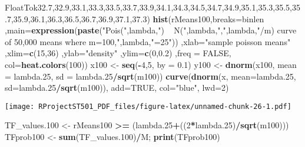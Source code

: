 \documentclass[
]{article}
\newenvironment{Shaded}{\begin{snugshade}}{\end{snugshade}}
\newcommand{\DataTypeTok}[1]{\textcolor[rgb]{0.13,0.29,0.53}{#1}}
\newcommand{\DecValTok}[1]{\textcolor[rgb]{0.00,0.00,0.81}{#1}}
\newcommand{\FloatTok}[1]{\textcolor[rgb]{0.00,0.00,0.81}{#1}}
\newcommand{\KeywordTok}[1]{\textcolor[rgb]{0.13,0.29,0.53}{\textbf{#1}}}
\newcommand{\NormalTok}[1]{#1}
\newcommand{\OperatorTok}[1]{\textcolor[rgb]{0.81,0.36,0.00}{\textbf{#1}}}
\newcommand{\OtherTok}[1]{\textcolor[rgb]{0.56,0.35,0.01}{#1}}
\newcommand{\StringTok}[1]{\textcolor[rgb]{0.31,0.60,0.02}{#1}}
\begin{document}
\begin{Shaded}
\begin{Highlighting}[]
FloatTok{32.7}\NormalTok{,}\FloatTok{32.9}\NormalTok{,}\FloatTok{33.1}\NormalTok{,}\FloatTok{33.3}\NormalTok{,}\FloatTok{33.5}\NormalTok{,}\FloatTok{33.7}\NormalTok{,}\FloatTok{33.9}\NormalTok{,}\FloatTok{34.1}\NormalTok{,}\FloatTok{34.3}\NormalTok{,}\FloatTok{34.5}\NormalTok{,}\FloatTok{34.7}\NormalTok{,}\FloatTok{34.9}\NormalTok{,}\FloatTok{35.1}\NormalTok{,}\FloatTok{35.3}\NormalTok{,}\FloatTok{35.5}\NormalTok{,}\FloatTok{35.7}\NormalTok{,}\FloatTok{35.9}\NormalTok{,}\FloatTok{36.1}\NormalTok{,}\FloatTok{36.3}\NormalTok{,}\FloatTok{36.5}\NormalTok{,}\FloatTok{36.7}\NormalTok{,}\FloatTok{36.9}\NormalTok{,}\FloatTok{37.1}\NormalTok{,}\FloatTok{37.3}\NormalTok{)}
\KeywordTok{hist}\NormalTok{(rMeans100,}\DataTypeTok{breaks=}\NormalTok{binlen ,}\DataTypeTok{main=}\KeywordTok{expression}\NormalTok{(}\KeywordTok{paste}\NormalTok{(}\StringTok{"Pois("}\NormalTok{,lambda,}\StringTok{") ~ N("}\NormalTok{,lambda,}\StringTok{","}\NormalTok{,lambda,}\StringTok{"/m) curve of 50,000 means where m=100,"}\NormalTok{,lambda,}\StringTok{"=25"}\NormalTok{))  ,}\DataTypeTok{xlab=}\StringTok{"sample poisson means"}\NormalTok{ ,}\DataTypeTok{xlim=}\KeywordTok{c}\NormalTok{(}\DecValTok{15}\NormalTok{,}\DecValTok{36}\NormalTok{) ,}\DataTypeTok{ylab=}\StringTok{"density"}\NormalTok{ ,}\DataTypeTok{ylim=}\KeywordTok{c}\NormalTok{(}\DecValTok{0}\NormalTok{,}\FloatTok{0.2}\NormalTok{) ,}\DataTypeTok{freq =} \OtherTok{FALSE}\NormalTok{, }\DataTypeTok{col=}\KeywordTok{heat.colors}\NormalTok{(}\DecValTok{100}\NormalTok{))}
\NormalTok{x100 <-}\StringTok{ }\KeywordTok{seq}\NormalTok{(}\OperatorTok{-}\DecValTok{4}\NormalTok{,}\DecValTok{5}\NormalTok{, }\DataTypeTok{by =} \FloatTok{0.1}\NormalTok{)}
\NormalTok{y100 <-}\StringTok{ }\KeywordTok{dnorm}\NormalTok{(x100, }\DataTypeTok{mean =}\NormalTok{ lambda}\FloatTok{.25}\NormalTok{, }\DataTypeTok{sd =}\NormalTok{ lambda}\FloatTok{.25}\OperatorTok{/}\KeywordTok{sqrt}\NormalTok{(m100))}
\KeywordTok{curve}\NormalTok{(}\KeywordTok{dnorm}\NormalTok{(x, }\DataTypeTok{mean=}\NormalTok{lambda}\FloatTok{.25}\NormalTok{, }\DataTypeTok{sd=}\NormalTok{lambda}\FloatTok{.25}\OperatorTok{/}\KeywordTok{sqrt}\NormalTok{(m100)), }\DataTypeTok{add=}\OtherTok{TRUE}\NormalTok{, }\DataTypeTok{col=}\StringTok{"blue"}\NormalTok{, }\DataTypeTok{lwd=}\DecValTok{2}\NormalTok{)}
\end{Highlighting}
\end{Shaded}

\texttt{[image: RProjectST501\_PDF\_files/figure-latex/unnamed-chunk-26-1.pdf]}

\begin{Shaded}
\begin{Highlighting}[]
\NormalTok{TF_values}\FloatTok{.100}\NormalTok{ <-}\StringTok{ }\NormalTok{rMeans100 }\OperatorTok{>=}\StringTok{ }\NormalTok{(lambda}\FloatTok{.25}\OperatorTok{+}\NormalTok{((}\DecValTok{2}\OperatorTok{*}\NormalTok{lambda}\FloatTok{.25}\NormalTok{)}\OperatorTok{/}\KeywordTok{sqrt}\NormalTok{(m100)))}
\NormalTok{TFprob100 <-}\StringTok{ }\KeywordTok{sum}\NormalTok{(TF_values}\FloatTok{.100}\NormalTok{)}\OperatorTok{/}\NormalTok{M; }\KeywordTok{print}\NormalTok{(TFprob100)}
\end{Highlighting}
\end{Shaded}
\end{document}

